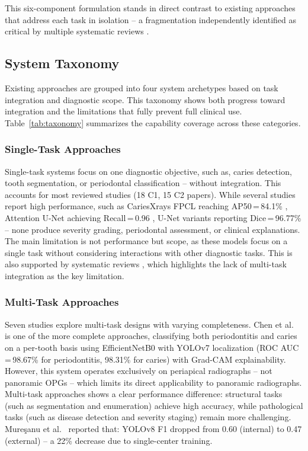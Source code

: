 \documentclass[conference]{IEEEtran}
\begin{document}
This six-component formulation stands in direct contrast to existing
approaches that address each task in isolation -- a fragmentation
independently identified as critical by multiple systematic reviews
\cite{iacob2025automated,albano2024artificial,bonfanti2025deep,
khubrani2025detection,zanini2024systematic,zhou2025deep}.

\subsection{System Taxonomy}

Existing approaches are grouped into four system archetypes based on task integration and diagnostic scope. This taxonomy shows both progress toward integration and the limitations that fully prevent full clinical use. Table~\ref{tab:taxonomy} summarizes the capability coverage across these categories.

\subsubsection{Single-Task Approaches}

Single-task systems focus on one diagnostic objective, such as, caries detection, tooth segmentation, or periodontal classification – without integration. This accounts for most reviewed studies (18 C1, 15 C2 papers). While several studies report high performance, such as CariesXrays FPCL reaching AP50\,=\,84.1\% \cite{chen2024cariesxrays},
Attention U-Net achieving Recall\,=\,0.96
\cite{pornprasertsuk2025clinical}, U-Net variants reporting
Dice\,=\,96.77\% \cite{vickram2025extraction} -- none produce severity
grading, periodontal assessment, or clinical explanations. The main limitation is not performance but scope, as these models focus on a single task without considering interactions with other diagnostic tasks. This is also supported by systematic reviews
\cite{albano2024artificial,zanini2024systematic}, which highlights the lack of multi-task integration as the key limitation.

\subsubsection{Multi-Task Approaches}

Seven studies explore multi-task designs with varying completeness. Chen et al.\ \cite{chen2023deep} is one of the more complete approaches, classifying both periodontitis and caries on a per-tooth basis using EfficientNetB0 with YOLOv7 localization  (ROC AUC\,=\,98.67\% for periodontitis, 98.31\% for caries) with Grad-CAM
explainability. However, this system operates exclusively on periapical
radiographs -- not panoramic OPGs -- which limits its direct applicability to panoramic radiographs. Multi-task approaches shows a clear performance difference: structural tasks (such as segmentation and enumeration) achieve high accuracy, while pathological tasks (such as disease detection and severity staging) remain more challenging. Mure\c{s}anu et al.\
\cite{muresanu2024automating} reported that: YOLOv8
F1 dropped from 0.60 (internal) to 0.47 (external) -- a 22\%
decrease due to single-center training.
\end{document}
